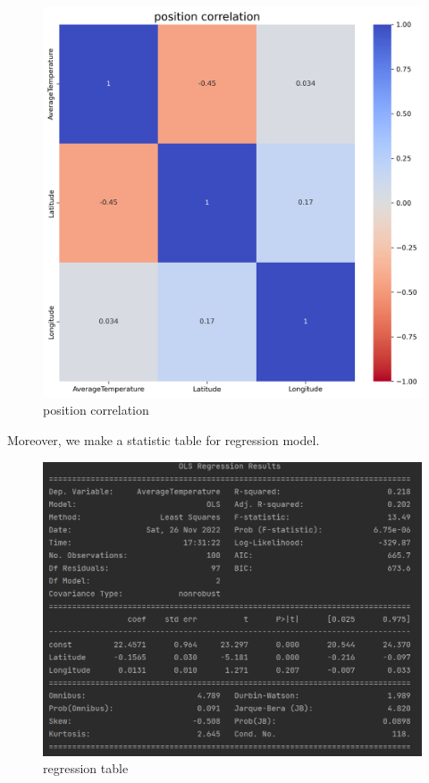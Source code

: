 \documentclass{apmcmthesis}
\begin{document}
\begin{figure}[htbp]
  \centering
  \includegraphics[scale=0.4]{position correlation.png}
  \caption{position correlation}\label{fig10}
\end{figure}

Moreover, we make a statistic table for regression model.

\begin{figure}[htbp]
  \centering
  \includegraphics[scale=0.52]{2a table.png}
  \caption{regression table}\label{fig11}
\end{figure}
\end{document}
